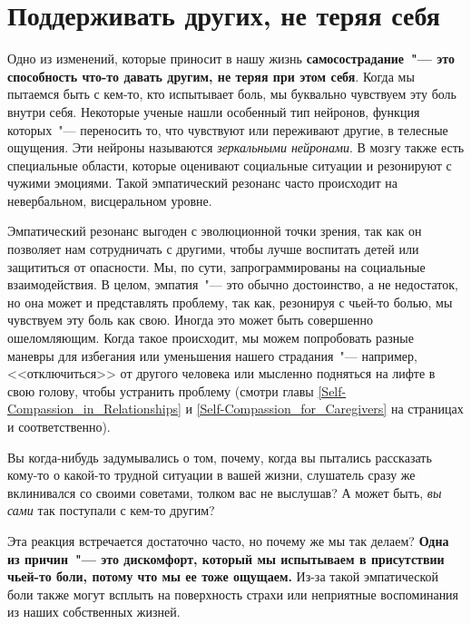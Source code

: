 
\chapter{Поддерживать других, не теряя себя} \label{Being_There_for_Others_without_Losing_Ourselves}

Одно из изменений, которые приносит в нашу жизнь \textbf{самосострадание~"--- это способность что-то давать другим, не теряя при этом себя}. Когда мы пытаемся быть с кем-то, кто испытывает боль, мы буквально чувствуем эту боль внутри себя.  Некоторые ученые нашли особенный тип нейронов, функция которых~"--- переносить то, что чувствуют или переживают другие, в телесные ощущения. Эти нейроны называются \emph{зеркальными нейронами}.  В мозгу также есть специальные области, которые оценивают социальные ситуации и резонируют с чужими эмоциями. Такой эмпатический резонанс часто происходит на невербальном, висцеральном уровне. 

Эмпатический резонанс выгоден с эволюционной точки зрения, так как он позволяет нам сотрудничать с другими, чтобы лучше воспитать детей или защититься от опасности. Мы, по сути, запрограммированы на социальные взаимодействия. В целом, эмпатия~"--- это обычно достоинство, а не недостаток, но она может и представлять проблему, так как, резонируя с чьей-то болью, мы чувствуем эту боль как свою. Иногда это может быть совершенно ошеломляющим. Когда такое происходит, мы можем попробовать разные маневры для избегания или уменьшения нашего страдания~"--- например, <<отключиться>> от другого человека или мысленно подняться на лифте в свою голову, чтобы устранить проблему (смотри главы \ref{Self-Compassion_in_Relationships} и \ref{Self-Compassion_for_Caregivers} на страницах \pageref{Self-Compassion_in_Relationships} и \pageref{Self-Compassion_for_Caregivers} соответственно). 

Вы когда-нибудь задумывались о том, почему, когда вы пытались рассказать кому-то о какой-то трудной ситуации в вашей жизни, слушатель сразу же вклинивался со своими советами, толком вас не выслушав? А может быть, \emph{вы сами} так поступали с кем-то другим? 

Эта реакция встречается достаточно часто, но почему же мы так делаем? \textbf{Одна из причин~"--- это дискомфорт, который мы испытываем в присутствии чьей-то боли, потому что мы ее тоже ощущаем.} Из-за такой эмпатической боли также могут всплыть на поверхность страхи или неприятные воспоминания из наших собственных жизней. 

